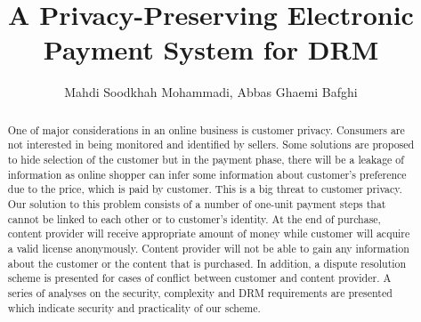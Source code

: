 \documentclass[times]{secauth}
\begin{document}


\title{A Privacy-Preserving Electronic Payment System for DRM}

\author{Mahdi Soodkhah Mohammadi\corrauth, Abbas Ghaemi Bafghi}


\begin{abstract}
One of major considerations in an online business is customer privacy. Consumers are not interested in being monitored and identified by sellers. Some solutions are proposed to hide selection of the customer but in the payment phase, there will be a leakage of information as online shopper can infer some information about customer's preference due to the price, which is paid by customer. This is a big threat to customer privacy. Our solution to this problem consists of a number of one-unit payment steps that cannot be linked to each other or to customer's identity. At the end of purchase, content provider will receive appropriate amount of money while customer will acquire a valid license anonymously. Content provider will not be able to gain any information about the customer or the content that is purchased. In addition, a dispute resolution scheme is presented for cases of conflict between customer and content provider. A series of analyses on the security, complexity and DRM requirements are presented which indicate security and practicality of our scheme.
\end{abstract}

\maketitle
\end{document}
